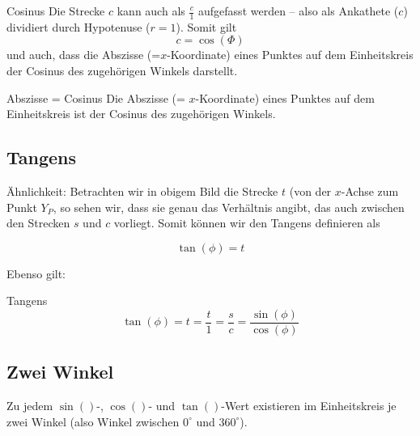 


\begin{bemerkung}{Cosinus}{}
  Die Strecke $c$ kann auch als $\frac{c}1$ aufgefasst werden -- also
  als Ankathete ($c$) dividiert durch Hypotenuse ($r=1$). Somit
  gilt
  $$c = \cos(\Phi)$$
  und auch, dass die Abszisse (=$x$-Koordinate) eines Punktes auf dem
  Einheitskreis der Cosinus des zugehörigen Winkels darstellt.
\end{bemerkung}

\begin{bemerkung}{Abszisse = Cosinus}{}
  Die Abszisse (= $x$-Koordinate) eines Punktes auf dem Einheitskreis ist
  der Cosinus des zugehörigen Winkels.
\end{bemerkung}

\newpage
\subsection{Tangens}




Ähnlichkeit: 
Betrachten wir in obigem Bild die Strecke $t$ (von der $x$-Achse zum
Punkt $Y_P$, so sehen wir, dass sie genau das Verhältnis angibt, das
auch zwischen den Strecken $s$ und $c$ vorliegt. 
Somit können wir den Tangens definieren als

$$\tan(\phi) = t$$

Ebenso gilt:
\begin{gesetz}{Tangens}{}
$$\tan(\phi) = t = \frac{t}{1} =  \frac{s}{c} = \frac{\sin(\phi)}{\cos(\phi)}$$
\end{gesetz}
\newpage

\subsection{Zwei Winkel}
Zu jedem $\sin()$-, $\cos()$- und $\tan()$-Wert existieren im
Einheitskreis je zwei Winkel (also Winkel zwischen $0^{\circ{}}$ und
$360^{\circ{}}$).


